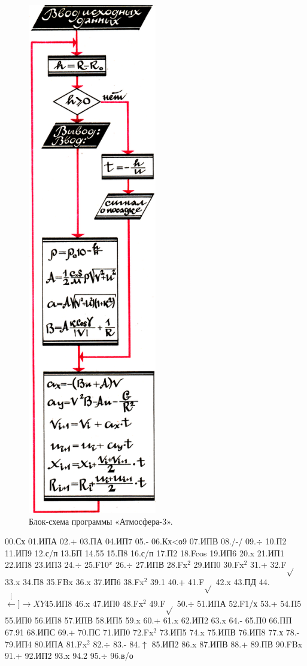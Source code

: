 \documentclass[11pt,a4paper,oneside]{article}
\def\XY{$\stackrel[\leftarrow]{\rightarrow}{XY}$}
\begin{document}
\begin{figure}[H]
\includegraphics[width=0.5\textwidth]{atmos3_2}
\caption{Блок-схема программы «Атмосфера-3».}
\end{figure}

00.Сх 01.ИПА 02.+ 03.ПА 04.ИП7 05.- 06.Кх<о9 07.ИПВ 08./-/ 09.$\div$ 10.П2 11.ИП9 12.с/п 13.БП 14.55 15.П8 16.с/п 17.П2
18.Fcos 19.ИП6 20.x 21.ИП1 22.ИП8 23.ИП3 24.$\div$
25.F10$^{x}$ 26.$\div$ 27.ИПВ 28.Fx$^{2}$ 29.ИП0 30.Fx$^{2}$ 31.+ 32.F$\sqrt{}$
33.x 34.П8 35.FBx 36.x 37.ИП6 38.Fx$^{2}$ 39.1 40.+ 41.F$\sqrt{}$ 42.x 43.ПД 44.\XY 45.ИП8 46.x 47.ИП0 48.Fx$^{2}$ 49.F$\sqrt{}$
50.$\div$ 51.ИПА 52.F1/х 53.+ 54.П5 55.ИП0 56.ИП8
57.ИПВ 58.ИП5 59.x 60.+ 61.x 62.ИП2 63.x 64.-
65.П0 66.ПП 67.91 68.ИПС 69.+ 70.ПС 71.ИП0
72.Fx$^{2}$ 73.ИП5 74.x 75.ИПВ 76.ИП8 77.х 78.- 79.ИП4
80.ИПА 81.Fx$^{2}$ 82.$\div$ 83.- 84.$\uparrow$ 85.ИП2 86.x 87.ИПВ 88.+ 89.ПВ 90.FBx 91.+ 92.ИП2 93.x 94.2 95.$\div$ 96.в/о
\end{document}
